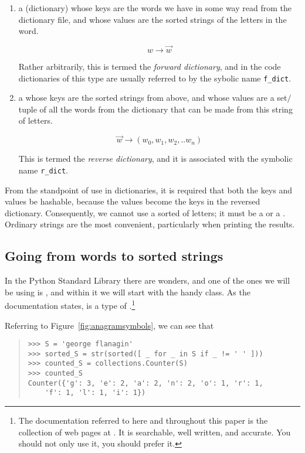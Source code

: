 \documentclass[letterpaper, 11pt]{article}
\begin{document}
\begin{enumerate}
\item a  (dictionary) whose keys are the words we have
in some way read from the dictionary file, and whose values are the
sorted strings of the letters in the word.

$$w \longrightarrow \overrightarrow{w}$$

Rather arbitrarily, this is termed the \emph{forward dictionary},
and in the code dictionaries of this type are usually referred
to by the sybolic name \verb|f_dict|.

\item a  whose keys are the sorted strings from above,
and whose values are a set$\slash$tuple of all the words from the
dictionary that can be made from this string of letters.

$$\overrightarrow{w} \longrightarrow (w_0, w_1, w_2, .. w_n)$$

This is termed the \emph{reverse dictionary}, and it is associated
with the symbolic name \verb|r_dict|. 

\end{enumerate}

From the standpoint of use in dictionaries, it is required that
both the keys and values be hashable, because the values become the
keys in the reversed dictionary. Consequently, we cannot use a
sorted  of letters; it must be a  or a .
Ordinary strings are the most convenient, particularly when 
printing the results.


\subsection{Going from words to sorted strings}

In the Python Standard Library there are wonders, and one of the
ones we will be using is , and within it we will
start with the handy  class. As the documentation
states,  is a type of .\footnote{The
documentation referred to here and throughout this paper is the
collection of web pages at .  It is searchable,
well written, and accurate. You should not only use it, you should
prefer it.}

Referring to Figure~\ref{fig:anagramsymbols}, we can see that 

\begin{quote}
\small
\begin{verbatim}
>>> S = 'george flanagin'
>>> sorted_S = str(sorted([ _ for _ in S if _ != ' ' ]))
>>> counted_S = collections.Counter(S)
>>> counted_S
Counter({'g': 3, 'e': 2, 'a': 2, 'n': 2, 'o': 1, 'r': 1, 
    'f': 1, 'l': 1, 'i': 1})
\end{verbatim}
\end{quote}
\end{document}
